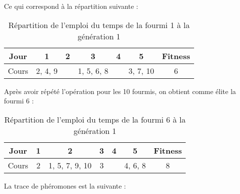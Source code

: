Ce qui correspond à la répartition suivante :

\begin{table}[H]
    \centering
    \begin{tabular}{|c|c|c|c|c|c|c|}
        \hline
        Jour  & 1       & 2 & 3          & 4 & 5        & Fitness \\
        \hline
        Cours & 2, 4, 9 &   & 1, 5, 6, 8 &   & 3, 7, 10 & 6       \\
        \hline
    \end{tabular}
    \caption{Répartition de l'emploi du temps de la fourmi 1 à la génération 1}\label{tab:fourmi-1-gen-1}
\end{table}

\clearpage

Après avoir répété l'opération pour les 10 fourmis, on obtient comme élite la fourmi 6 :

\begin{table}[!h]
    \centering
    \begin{tabular}{|c|c|c|c|c|c|c|}
        \hline
        Jour  & 1 & 2              & 3 & 4 & 5       & Fitness \\
        \hline
        Cours & 2 & 1, 5, 7, 9, 10 & 3 &   & 4, 6, 8 & 8       \\
        \hline
    \end{tabular}
    \caption{Répartition de l'emploi du temps de la fourmi 6 à la génération 1}\label{tab:fourmi-6-gen-1}
\end{table}

La trace de phéromones est la suivante :

